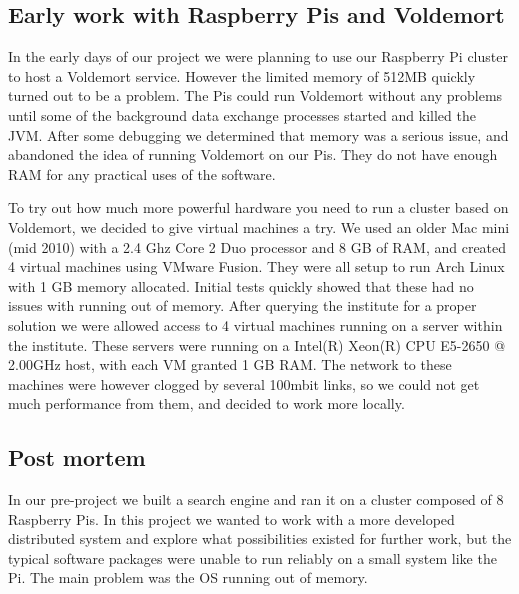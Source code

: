 \subsection*{Early work with Raspberry Pis and Voldemort}
In the early days of our project we were planning to use our Raspberry Pi cluster to host a Voldemort service. However the limited memory of 512MB quickly turned out to be a problem. The Pis could run Voldemort without any problems until some of the background data exchange processes started and killed the JVM. After some debugging we determined that memory was a serious issue, and abandoned the idea of running Voldemort on our Pis. They do not have enough RAM for any practical uses of the software.

To try out how much more powerful hardware you need to run a cluster based on Voldemort, we decided to give virtual machines a try. We used an older Mac mini (mid 2010) with a 2.4 Ghz Core 2 Duo processor and 8 GB of RAM, and created 4 virtual machines using VMware Fusion. They were all setup to run Arch Linux with 1 GB memory allocated. Initial tests quickly showed that these had no issues with running out of memory. After querying the institute for a proper solution we were allowed access to 4 virtual machines running on a server within the institute. These servers were running on a Intel(R) Xeon(R) CPU E5-2650 @ 2.00GHz host, with each VM granted 1 GB RAM. The network to these machines were however clogged by several 100mbit links, so we could not get much performance from them, and decided to work more locally.

\subsection{Post mortem}
In our pre-project we built a search engine and ran it on a cluster composed of 8 Raspberry Pis. In this project we wanted to work with a more developed distributed system and explore what possibilities existed for further work, but the typical software packages were unable to run reliably on a small system like the Pi. The main problem was the OS running out of memory.

